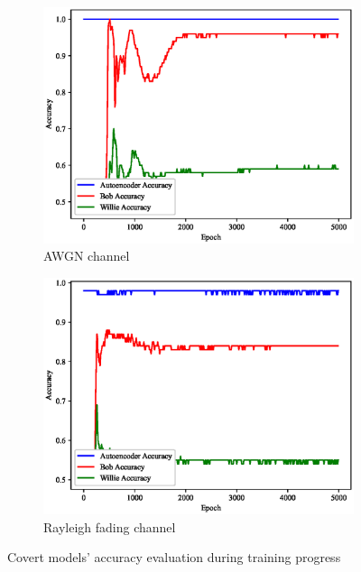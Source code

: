 \begin{figure}[bp!] \label{fig:traning_progress}
	\begin{subfigure}{0.235\textwidth}
		\includegraphics[width=\linewidth]{figs/training_progress_awgn}
		\caption{AWGN channel}
	\end{subfigure}
	\hspace*{\fill}
	\begin{subfigure}{0.235\textwidth}
		\includegraphics[width=\linewidth]{figs/training_progress_rayleigh}
		\caption{Rayleigh fading channel}	
	\end{subfigure}
	\caption{Covert models' accuracy evaluation during training progress}%
\end{figure}
